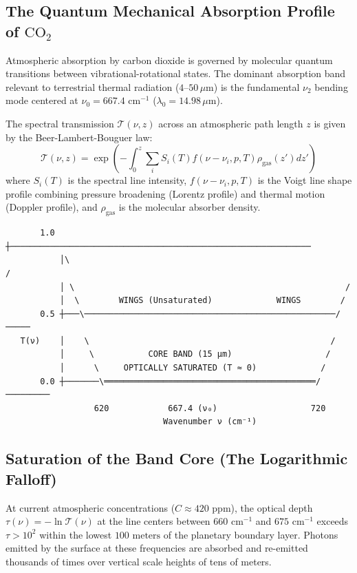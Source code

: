 \documentclass[10pt,twocolumn]{article}
\begin{document}
\subsection{The Quantum Mechanical Absorption Profile of $\text{CO}_2$}

Atmospheric absorption by carbon dioxide is governed by molecular quantum transitions between vibrational-rotational states. The dominant absorption band relevant to terrestrial thermal radiation ($4\text{--}50\,\mu\text{m}$) is the fundamental $\nu_2$ bending mode centered at $\nu_0 = 667.4\text{ cm}^{-1}$ ($\lambda_0 = 14.98\,\mu\text{m}$).

The spectral transmission $\mathcal{T}(\nu, z)$ across an atmospheric path length $z$ is given by the Beer-Lambert-Bouguer law:
\begin{equation}
  \mathcal{T}(\nu, z) = \exp\left( -\int_0^z \sum_i S_i(T) f(\nu - \nu_i, p, T) \rho_{\text{gas}}(z') dz' \right)
\end{equation}
where $S_i(T)$ is the spectral line intensity, $f(\nu - \nu_i, p, T)$ is the Voigt line shape profile combining pressure broadening (Lorentz profile) and thermal motion (Doppler profile), and $\rho_{\text{gas}}$ is the molecular absorber density.

\begin{verbatim}
       1.0 ┼─────────────────────────────────────────────────────────────
           │\                                                         /
           │ \                                                       /
           │  \        WINGS (Unsaturated)             WINGS        /
       0.5 ┼───\───────────────────────────────────────────────────/─────
   T(ν)    │    \                                                 /
           │     \           CORE BAND (15 μm)                   /
           │      \     OPTICALLY SATURATED (T ≈ 0)             /
       0.0 ┼───────\═══════════════════════════════════════════/─────────
                  620            667.4 (ν₀)                   720
                                Wavenumber ν (cm⁻¹)
\end{verbatim}


\subsection{Saturation of the Band Core (The Logarithmic Falloff)}

At current atmospheric concentrations ($C \approx 420\text{ ppm}$), the optical depth $\tau(\nu) = -\ln \mathcal{T}(\nu)$ at the line centers between $660\text{ cm}^{-1}$ and $675\text{ cm}^{-1}$ exceeds $\tau > 10^2$ within the lowest $100\text{ meters}$ of the planetary boundary layer. Photons emitted by the surface at these frequencies are absorbed and re-emitted thousands of times over vertical scale heights of tens of meters.
\end{document}
